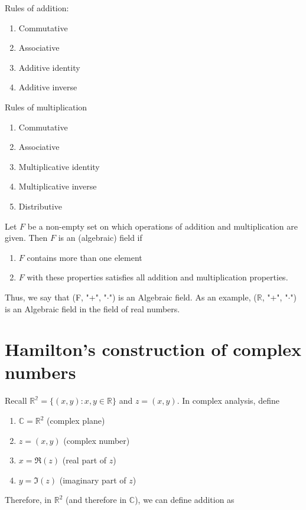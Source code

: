 \documentclass{article}
\newtheorem{one minute paper}[theorem]{One Minute Paper}
\begin{document}
Rules of addition:
\begin{enumerate}
    \item Commutative
    \item Associative
    \item Additive identity
    \item Additive inverse
\end{enumerate}

Rules of multiplication
\begin{enumerate}
    \item Commutative
    \item Associative
    \item Multiplicative identity
    \item Multiplicative inverse
    \item Distributive
\end{enumerate}

Let $F$ be a non-empty set on which operations of addition and multiplication are given. Then $F$ is an (algebraic) field if 
\begin{enumerate}
    \item $F$ contains more than one element
    \item $F$ with these properties satisfies all addition and multiplication properties. 
\end{enumerate}

Thus, we say that (F, "+", "$\cdot$") is an Algebraic field. As an example, ($\mathbb{R}$, "+", "$\cdot$") is an Algebraic field in the field of real numbers. 

\section*{Hamilton's construction of complex numbers}

Recall $\mathbb{R^2} = \{(x,y): x,y \in \mathbb{R}\}$ and $z = (x,y)$. In complex analysis, define 

\begin{enumerate}
    \item $\mathbb{C} = \mathbb{R}^2$ (complex plane)
    \item $z = (x,y)$ (complex number)
    \item $x = \Re(z)$ (real part of $z$)
    \item $y = \Im(z)$ (imaginary part of $z$)
\end{enumerate}

Therefore, in $\mathbb{R}^2$ (and therefore in $\mathbb{C}$), we can define addition as 
\end{document}
